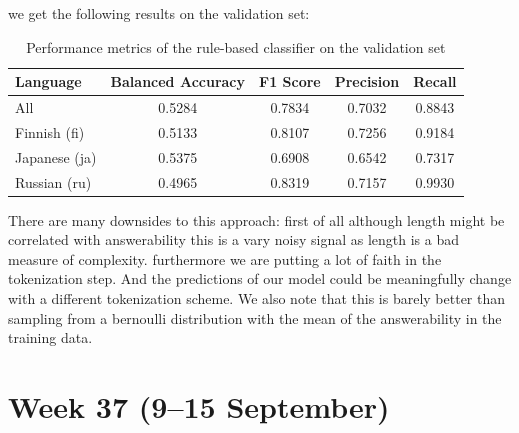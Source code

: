 \documentclass[11pt]{article}
\begin{document}
\begin{enumerate}
    we get the following results on the validation set:

    \begin{table}[ht]
        \centering
        \begin{tabular}{|l|c|c|c|c|}
            \hline
            Language & Balanced Accuracy & F1 Score & Precision & Recall \\
            \hline
            All & 0.5284 & 0.7834 & 0.7032 & 0.8843 \\
            Finnish (fi) & 0.5133 & 0.8107 & 0.7256 & 0.9184 \\
            Japanese (ja) & 0.5375 & 0.6908 & 0.6542 & 0.7317 \\
            Russian (ru) & 0.4965 & 0.8319 & 0.7157 & 0.9930 \\
            \hline
        \end{tabular}
        \caption{Performance metrics of the rule-based classifier on the validation set}
        \label{tab:classifier_performance}
    \end{table}

    There are many downsides to this approach: 
    first of all although length might be correlated with answerability this is a vary noisy signal as length is a bad measure of complexity.
    furthermore we are putting a lot of faith in the tokenization step. And the predictions of our model could be meaningfully change with a different tokenization scheme.
    We also note that this is barely better than sampling from a bernoulli distribution with the mean of the answerability in the training data.

\end{enumerate}

\section{Week 37 (9--15 September)}
\end{document}
